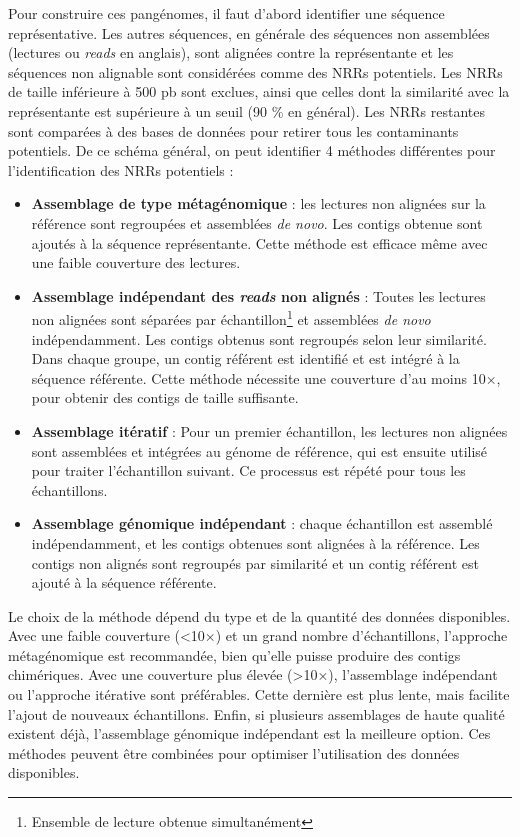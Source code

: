 Pour construire ces pangénomes, il faut d'abord identifier une séquence représentative. Les autres séquences, en générale des séquences non assemblées (lectures ou \textit{reads} en anglais), sont alignées contre la représentante et les séquences non alignable sont considérées comme des NRRs potentiels. Les NRRs de taille inférieure à 500 pb sont exclues, ainsi que celles dont la similarité avec la représentante est supérieure à un seuil (90 \% en général). Les NRRs restantes sont comparées à des bases de données pour retirer tous les contaminants potentiels. De ce schéma général, on peut identifier 4 méthodes différentes pour l'identification des NRRs potentiels :
\begin{itemize}
    \item \textbf{Assemblage de type métagénomique} : les lectures non alignées sur la référence sont regroupées et assemblées \textit{de novo}. Les contigs obtenue sont ajoutés à la séquence représentante. Cette méthode est efficace même avec une faible couverture des lectures.
    \item \textbf{Assemblage indépendant des \textit{reads} non alignés} : Toutes les lectures non alignées sont séparées par échantillon\footnote{Ensemble de lecture obtenue simultanément} et assemblées \textit{de novo} indépendamment. Les contigs obtenus sont regroupés selon leur similarité. Dans chaque groupe, un contig référent est identifié et est intégré à la séquence référente. Cette méthode nécessite une couverture d’au moins 10×, pour obtenir des contigs de taille suffisante.
    \item \textbf{Assemblage itératif} : Pour un premier échantillon, les lectures non alignées sont assemblées et intégrées au génome de référence, qui est ensuite utilisé pour traiter l’échantillon suivant. Ce processus est répété pour tous les échantillons.
    \item \textbf{Assemblage génomique indépendant} : chaque échantillon est assemblé indépendamment, et les contigs obtenues sont alignées à la référence. Les contigs non alignés sont regroupés par similarité et un contig référent est ajouté à la séquence référente.
\end{itemize}

Le choix de la méthode dépend du type et de la quantité des données disponibles. Avec une faible couverture (<10×) et un grand nombre d’échantillons, l’approche métagénomique est recommandée, bien qu’elle puisse produire des contigs chimériques. Avec une couverture plus élevée (>10×), l’assemblage indépendant ou l’approche itérative sont préférables. Cette dernière est plus lente, mais facilite l’ajout de nouveaux échantillons. Enfin, si plusieurs assemblages de haute qualité existent déjà, l’assemblage génomique indépendant est la meilleure option. Ces méthodes peuvent être combinées pour optimiser l’utilisation des données disponibles.
 
